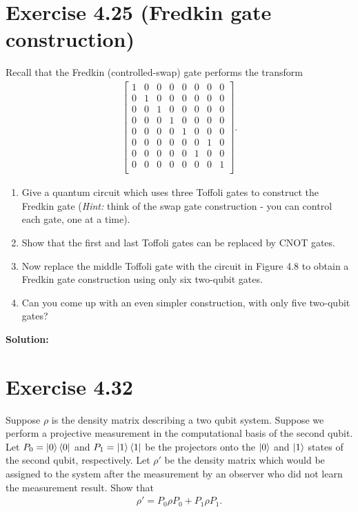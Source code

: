 \documentclass{book}
\begin{document}
\section*{Exercise 4.25 (Fredkin gate construction)}
    Recall that the Fredkin (controlled-swap) gate performs the transform
    \begin{align}
    \begin{bmatrix}
        1 & 0 & 0 & 0 & 0 & 0 & 0 & 0 \\
        0 & 1 & 0 & 0 & 0 & 0 & 0 & 0 \\
        0 & 0 & 1 & 0 & 0 & 0 & 0 & 0 \\
        0 & 0 & 0 & 1 & 0 & 0 & 0 & 0 \\
        0 & 0 & 0 & 0 & 1 & 0 & 0 & 0 \\
        0 & 0 & 0 & 0 & 0 & 0 & 1 & 0 \\
        0 & 0 & 0 & 0 & 0 & 1 & 0 & 0 \\
        0 & 0 & 0 & 0 & 0 & 0 & 0 & 1 \\
    \end{bmatrix}.
    \end{align}
    \begin{enumerate}
        \item Give a quantum circuit which uses three Toffoli gates to construct the Fredkin gate (\emph{Hint:} think of the swap gate construction - you can control each gate, one at a time).
        \item Show that the first and last Toffoli gates can be replaced by CNOT gates.
        \item Now replace the middle Toffoli gate with the circuit in Figure 4.8 to obtain a Fredkin gate construction using only six two-qubit gates.
        \item Can you come up with an even simpler construction, with only five two-qubit gates?
    \end{enumerate}

    \textbf{Solution:} 

\section*{Exercise 4.32}
    Suppose $\rho$ is the density matrix describing a two qubit system. Suppose we perform a projective measurement in the computational basis of the second qubit. Let $P_0 = \ket{0}\bra{0}$ and $P_1 = \ket{1}\bra{1}$ be the projectors onto the $\ket{0}$ and $\ket{1}$ states of the second qubit, respectively. Let $\rho'$ be the density matrix which would be assigned to the system after the measurement by an observer who did not learn the measurement result. Show that
    \begin{align}
        \rho' = P_0 \rho P_0 + P_1 \rho P_1.
    \end{align}
\end{document}

